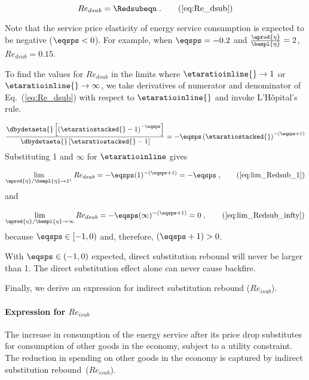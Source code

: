 \begin{equation}
  Re_{dsub} = \Redsubeqn \; . \tag{\ref{eq:Re_dsub}}
\end{equation}

Note that the service price elasticity of energy service consumption is
expected to be negative ($\eqsps < 0$).
For example, when $\eqsps = -0.2$ and $\frac{\aprod{\eta}}{\bempl{\eta}} = 2$,
$Re_{dsub} = 0.15$.

To find the values for $Re_{dsub}$ in the limits where $\etaratioinline{} \to 1$ or 
$\etaratioinline{} \to \infty$, we take derivatives of numerator and denominator
of Eq.~(\ref{eq:Re_dsub}) with respect to $\etaratioinline{}$ and invoke L'H\^{o}pital's rule.

\begin{equation}
  \frac{\dbydetaeta{}\left[ \left( \etaratiostacked{} - 1 \right)^{-\eqsps}  \right]}
           {\dbydetaeta{}\left[ \etaratiostacked{} - 1\right]}
    = -\eqsps \left( \etaratiostacked{} \right)^{-(\eqsps + 1)}
\end{equation}
%
Substituting 1 and $\infty$ for $\etaratioinline$ gives

\begin{equation}
  \lim_{\aprod{\eta}/\bempl{\eta} \to 1^{\!+}} Re_{dsub} 
    = -\eqsps ( 1 )^{-(\eqsps + 1)}
    = -\eqsps \; ,                               \tag{\ref{eq:lim_Redsub_1}}
\end{equation}
%
and

\begin{equation}
  \lim_{\aprod{\eta}/\bempl{\eta} \to \infty} Re_{dsub} 
    = -\eqsps ( \infty )^{-(\eqsps + 1)}
    = 0 \; ,                                              \tag{\ref{eq:lim_Redsub_infty}}
\end{equation}
%
because $\eqsps \in [-1, 0)$ and, therefore, $(\eqsps + 1) > 0$.

With $\eqsps \in (-1, 0)$ expected,
direct substitution rebound will never be larger than 1.
The direct substitution effect alone
can never cause backfire. 

Finally, we derive an expression for indirect substitution rebound ($Re_{isub}$).


\paragraph{Expression for $Re_{isub}$}
\label{sec:Re_isub}

The increase in consumption of the energy service after its price drop
substitutes for consumption of other goods in the economy,
subject to a utility constraint.
The reduction in spending on other goods in the economy
is captured by indirect substitution rebound~($Re_{isub}$).

